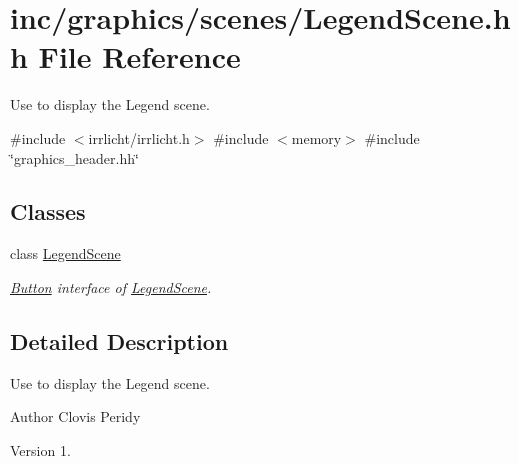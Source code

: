 \hypertarget{LegendScene_8hh}{}\section{inc/graphics/scenes/\+Legend\+Scene.hh File Reference}
\label{LegendScene_8hh}


Use to display the Legend scene.  


{\ttfamily \#include $<$irrlicht/irrlicht.\+h$>$}\newline
{\ttfamily \#include $<$memory$>$}\newline
{\ttfamily \#include \char`\"{}graphics\+\_\+header.\+hh\char`\"{}}\newline
\subsection*{Classes}
\begin{DoxyCompactItemize}
\item 
class \hyperlink{classLegendScene}{Legend\+Scene}
\begin{DoxyCompactList}\small\item\em \hyperlink{classButton}{Button} interface of \hyperlink{classLegendScene}{Legend\+Scene}. \end{DoxyCompactList}\end{DoxyCompactItemize}


\subsection{Detailed Description}
Use to display the Legend scene. 

\begin{DoxyAuthor}{Author}
Clovis Peridy 
\end{DoxyAuthor}
\begin{DoxyVersion}{Version}
1. 
\end{DoxyVersion}
